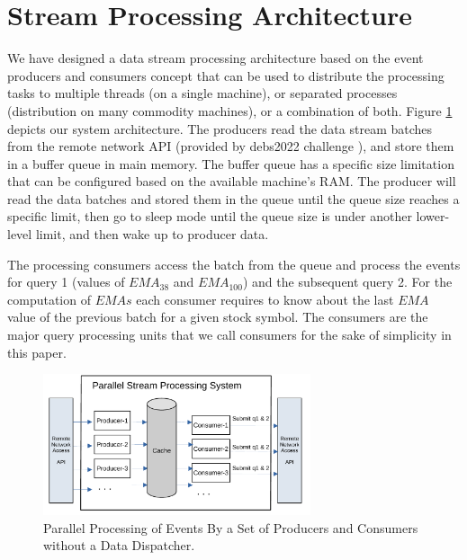 \section{Stream Processing Architecture}\label{sec:concepts}
We have designed a data stream processing architecture based on the event producers and consumers concept that can be used to distribute the processing tasks to multiple threads (on a single machine), or  separated processes (distribution on many commodity machines), or a combination of both. 
Figure \ref{fig:parallel-srream-processing1} depicts our system architecture. The producers read the data stream batches from the remote  network API (provided by debs2022 challenge \cite{debs2022challenge}), and store them in a buffer queue in main memory. 
The buffer queue has a specific size limitation that can be configured based  on the available machine's RAM. The producer will read the data batches and stored them in the queue until the queue size reaches a specific limit, then go to sleep mode until the queue size is under another lower-level limit, and then wake up to producer data. 

The processing consumers access the batch from the queue and process the events for query 1 (values of $EMA_{38}$ and $EMA_{100}$) 
and the subsequent query 2. For the computation of $EMAs$ each consumer requires to know about the last $EMA$ value of the previous batch for a given stock symbol. 
The consumers are the major query processing units that we call consumers for the sake of simplicity in this paper. 

\begin{figure}[!ht]
    \begin{center}
        \includegraphics[width=0.7\textwidth]{./images/Parallel-Stream-Processing-System_v1}
        \caption{Parallel Processing of Events By a Set of Producers and Consumers without a Data Dispatcher.}
        \label{fig:parallel-srream-processing1}
    \end{center}
\end{figure}

